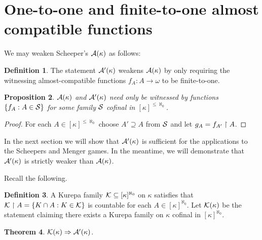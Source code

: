 \documentclass{amsart}
\theoremstyle{plain}
\newtheorem{theorem}{Theorem}
\newtheorem{proposition}[theorem]{Proposition}
\theoremstyle{definition}
\newtheorem{definition}[theorem]{Definition}
\theoremstyle{remark}
\theoremstyle{plain}
\theoremstyle{definition}
\theoremstyle{remark}
\begin{document}
  \section{One-to-one and finite-to-one almost compatible functions}

  We may weaken Scheeper's \(\mathcal{A}(\kappa)\) as follows:

  \begin{definition}
    The statement \(\mathcal{A}'(\kappa)\) weakens \(\mathcal{A}(\kappa)\) by only
    requiring the witnessing almost-compatible functions \(f_A:A\to\omega\)
    to be finite-to-one.
  \end{definition}

  \begin{proposition}
    \(\mathcal{A}(\kappa)\) and \(\mathcal{A}'(\kappa)\) need only be witnessed by
    functions \(\{f_A:A\in\mathcal{S}\}\) for some family \(\mathcal{S}\)
    cofinal in \([\kappa]^{\leq\aleph_0}\).
  \end{proposition}

  \begin{proof}
    For each \(A\in[\kappa]^{\leq\aleph_0}\) choose \(A'\supseteq A\)
    from \(\mathcal{S}\) and let \(g_A=f_{A'}\restriction A\).
  \end{proof}

  In the next section we will show that \(\mathcal{A}'(\kappa)\) is sufficient
  for the applications to the Scheepers and Menger games.
  In the meantime, we will demonstrate that \(\mathcal{A}'(\kappa)\) is strictly
  weaker than \(\mathcal{A}(\kappa)\).

  Recall the following.

  \begin{definition}
    A Kurepa family \(\mathcal{K}\subseteq[\kappa]^{\aleph_0}\) on \(\kappa\)
    satisfies that
    \(\mathcal{K}\restriction A=\{K\cap A:K\in\mathcal{K}\}\) is countable
    for each \(A\in[\kappa]^{\aleph_0}\).
    Let \(\mathcal{K}(\kappa)\) be the statement claiming there exists
    a Kurepa family on \(\kappa\)
    cofinal in \([\kappa]^{\aleph_0}\).
  \end{definition}

  \begin{theorem}
    \(\mathcal{K}(\kappa) \Rightarrow \mathcal{A}'(\kappa)\).
  \end{theorem}
\end{document}
